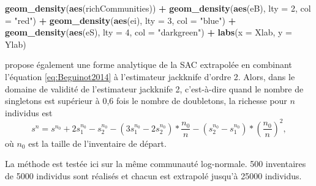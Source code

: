 \documentclass[
  11pt,
  french,
  a4paper,
  extrafontsizes,onecolumn,openright
  ]{memoir}
\newenvironment{Shaded}{\begin{snugshade}}{\end{snugshade}}
\newcommand{\DataTypeTok}[1]{\textcolor[rgb]{0.13,0.29,0.53}{#1}}
\newcommand{\DecValTok}[1]{\textcolor[rgb]{0.00,0.00,0.81}{#1}}
\newcommand{\KeywordTok}[1]{\textcolor[rgb]{0.13,0.29,0.53}{\textbf{#1}}}
\newcommand{\NormalTok}[1]{#1}
\newcommand{\OperatorTok}[1]{\textcolor[rgb]{0.81,0.36,0.00}{\textbf{#1}}}
\newcommand{\StringTok}[1]{\textcolor[rgb]{0.31,0.60,0.02}{#1}}
\begin{document}
\begin{Shaded}
\begin{Highlighting}[]
\StringTok{  }\KeywordTok{geom_density}\NormalTok{(}\KeywordTok{aes}\NormalTok{(richCommunities)) }\OperatorTok{+}
\StringTok{  }\KeywordTok{geom_density}\NormalTok{(}\KeywordTok{aes}\NormalTok{(eB), }\DataTypeTok{lty =} \DecValTok{2}\NormalTok{, }\DataTypeTok{col =} \StringTok{"red"}\NormalTok{) }\OperatorTok{+}
\StringTok{  }\KeywordTok{geom_density}\NormalTok{(}\KeywordTok{aes}\NormalTok{(ei), }\DataTypeTok{lty =} \DecValTok{3}\NormalTok{, }\DataTypeTok{col =} \StringTok{"blue"}\NormalTok{) }\OperatorTok{+}
\StringTok{  }\KeywordTok{geom_density}\NormalTok{(}\KeywordTok{aes}\NormalTok{(eS), }\DataTypeTok{lty =} \DecValTok{4}\NormalTok{, }\DataTypeTok{col =} \StringTok{"darkgreen"}\NormalTok{) }\OperatorTok{+}
\StringTok{  }\KeywordTok{labs}\NormalTok{(}\DataTypeTok{x =}\NormalTok{ Xlab, }\DataTypeTok{y =}\NormalTok{ Ylab)}
\end{Highlighting}
\end{Shaded}

\normalsize

\textcite{Beguinot2015a} propose également une forme analytique de la SAC extrapolée en combinant l'équation \eqref{eq:Beguinot2014} à l'estimateur jackknife d'ordre 2.
Alors, dans le domaine de validité de l'estimateur jackknife 2, c'est-à-dire quand le nombre de singletons est supérieur à 0,6 fois le nombre de doubletons, la richesse pour \(n\) individus est
\begin{equation}
  \label{eq:Beguinot2015a}
  s^{n}
  = s^{n_0}
  +2s^{n_0}_{1}-s^{n_0}_{2}
  -\left(3s^{n_0}_{1}-2s^{n_0}_{2}\right)*\frac{n_0}{n}
  -\left(s^{n_0}_{2}-s^{n_0}_{1}\right)*\left(\frac{n_0}{n}\right)^2,
\end{equation}
où \(n_0\) est la taille de l'inventaire de départ.

La méthode est testée ici sur la même communauté log-normale.
500 inventaires de 5000 individus sont réalisés et chacun est extrapolé jusqu'à 25000 individus.

\scriptsize
\end{document}
